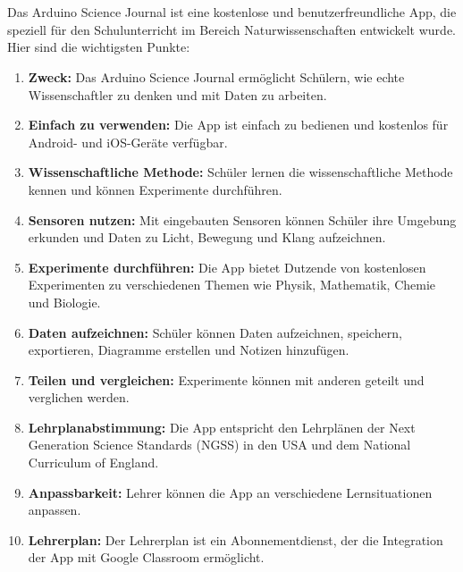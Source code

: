 %
%
%


\chapter{}
    
    
Das Arduino Science Journal ist eine kostenlose und benutzerfreundliche App, die speziell für den Schulunterricht im Bereich Naturwissenschaften entwickelt wurde. Hier sind die wichtigsten Punkte: \cite{}

\begin{enumerate}
  \item \textbf{Zweck:} Das Arduino Science Journal ermöglicht Schülern, wie echte Wissenschaftler zu denken und mit Daten zu arbeiten.
  \item \textbf{Einfach zu verwenden:} Die App ist einfach zu bedienen und kostenlos für Android- und iOS-Geräte verfügbar.
  \item \textbf{Wissenschaftliche Methode:} Schüler lernen die wissenschaftliche Methode kennen und können Experimente durchführen.
  \item \textbf{Sensoren nutzen:} Mit eingebauten Sensoren können Schüler ihre Umgebung erkunden und Daten zu Licht, Bewegung und Klang aufzeichnen.
  \item \textbf{Experimente durchführen:} Die App bietet Dutzende von kostenlosen Experimenten zu verschiedenen Themen wie Physik, Mathematik, Chemie und Biologie.
  \item \textbf{Daten aufzeichnen:} Schüler können Daten aufzeichnen, speichern, exportieren, Diagramme erstellen und Notizen hinzufügen.
  \item \textbf{Teilen und vergleichen:} Experimente können mit anderen geteilt und verglichen werden.
  \item \textbf{Lehrplanabstimmung:} Die App entspricht den Lehrplänen der Next Generation Science Standards (NGSS) in den USA und dem National Curriculum of England.
  \item \textbf{Anpassbarkeit:} Lehrer können die App an verschiedene Lernsituationen anpassen.
  \item \textbf{Lehrerplan:} Der Lehrerplan ist ein Abonnementdienst, der die Integration der App mit Google Classroom ermöglicht.

\end{enumerate}
